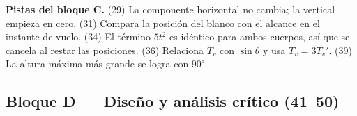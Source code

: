 \documentclass[12pt, letterpaper]{article}
\providecommand{\sen}{\sin}
\begin{document}
\begin{cuadroextra}
  \small
  \textbf{Pistas del bloque C.} (29) La componente horizontal no cambia; la
  vertical empieza en cero. (31) Compara la posición del blanco con el
  alcance en el instante de vuelo. (34) El término $5t^2$ es idéntico para
  ambos cuerpos, así que se cancela al restar las posiciones. (36) Relaciona
  $T_v$ con $\sen\theta$ y usa $T_v=3T_v'$. (39) La altura máxima más grande
  se logra con $90^\circ$.
\end{cuadroextra}

\subsection*{Bloque D — Diseño y análisis crítico \muyDificil\hspace{0.7em}(41--50)}
\end{document}
